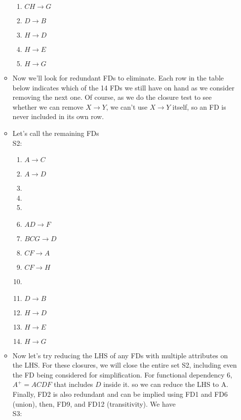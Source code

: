 \documentclass{homework}
\begin{document}
\begin{enumerate}[label=(\Alph*)]
\begin{itemize}
\begin{enumerate}[label=\arabic*]
            \item $CH\rightarrow G$
            \item $D\rightarrow B$
            \item $H\rightarrow D$
            \item $H\rightarrow E$
            \item $H\rightarrow G$
        \end{enumerate}
        \item Now we'll look for redundant FDs to eliminate. Each row in the table below indicates which of the 14 FDs we still have on hand as we consider removing the next one. Of course, as we do the closure test to see whether we can remove $X\rightarrow Y$, we can't use $X\rightarrow Y$ itself, so an FD is never included in its own row.
        \item Let's call the remaining FDs 
        \\S2:
        \begin{enumerate}[label=\arabic*]
            \item $A\rightarrow C$
            \item $A\rightarrow D$
            \item 
            \item 
            \item 
            \item $AD\rightarrow F$
            \item $BCG\rightarrow D$
            \item $CF\rightarrow A$
            \item $CF\rightarrow H$
            \item 
            \item $D\rightarrow B$
            \item $H\rightarrow D$
            \item $H\rightarrow E$
            \item $H\rightarrow G$
        \end{enumerate}
        \item Now let's try reducing the LHS of any FDs with multiple attributes on the LHS. For these closures, we will close the entire set S2, including even the FD being considered for simplification. For functional dependency 6, $A^+=ACDF$ that includes $D$ inside it. so we can reduce the LHS to A. Finally, FD2 is also redundant and can be implied using FD1 and FD6 (union), then, FD9, and FD12 (transitivity). We have \\S3:

\end{itemize}
\end{enumerate}
\end{document}
